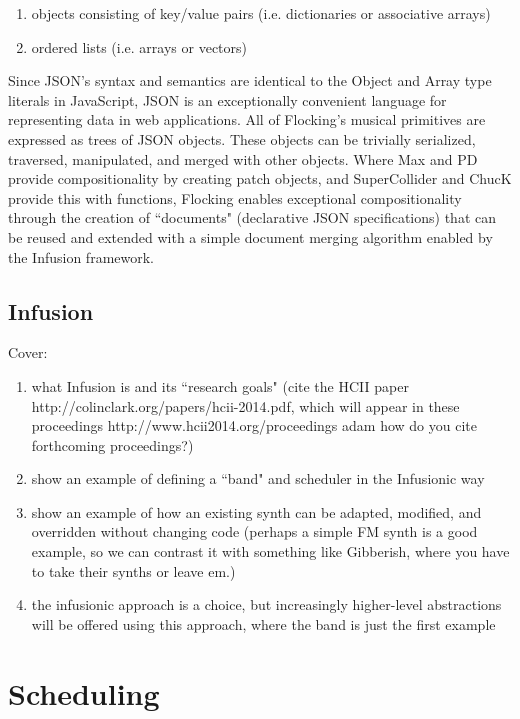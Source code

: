 \documentclass{article}
\begin{document}
\begin{enumerate}
\item objects consisting of key/value pairs (i.e. dictionaries or associative arrays)
\item ordered lists (i.e. arrays or vectors)
\end{enumerate}

Since JSON's syntax and semantics are identical to the Object and Array type literals in JavaScript, JSON is an exceptionally convenient language for representing data in web applications. All of Flocking's musical primitives are expressed as trees of JSON objects. These objects can be trivially serialized, traversed, manipulated, and merged with other objects. Where Max and PD provide compositionality by creating patch objects, and SuperCollider and ChucK provide this with functions, Flocking enables exceptional compositionality through the creation of ``documents" (declarative JSON specifications) that can be reused and extended with a simple document merging algorithm enabled by the Infusion framework.

\subsection{Infusion}

Cover:

\begin{enumerate}
\item what Infusion is and its ``research goals" (cite the HCII paper http://colinclark.org/papers/hcii-2014.pdf, which will appear in these proceedings http://www.hcii2014.org/proceedings adam how do you cite forthcoming proceedings?)
\item show an example of defining a ``band" and scheduler in the Infusionic way
\item show an example of how an existing synth can be adapted, modified, and overridden without changing code (perhaps a simple FM synth is a good example, so we can contrast it with something like Gibberish, where you have to take their synths or leave em.)
\item the infusionic approach is a choice, but increasingly higher-level abstractions will be offered using this approach, where the band is just the first example
\end{enumerate}

\section{Scheduling} \label{sec:Scheduling}
\end{document}
